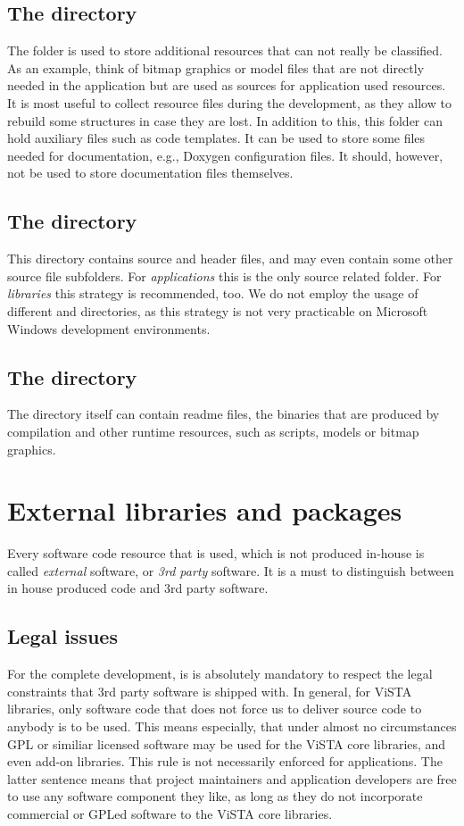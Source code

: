 \subsection{The  directory}
The  folder is used to store additional resources that can not really be classified.
As an example, think of bitmap graphics or model files that are not directly needed in the application but are used as sources for application used resources.
It is most useful to collect resource files during the development, as they allow to rebuild some structures in case they are lost.
In addition to this, this folder can hold auxiliary files such as code templates.
It can be used to store some files needed for documentation, e.g., Doxygen configuration files.
It should, however, not be used to store documentation files themselves.


\subsection{The  directory}
This directory contains source and header files, and may even contain some other source file subfolders.
For \textit{applications} this is the only source related folder.
For \textit{libraries} this strategy is recommended, too.
We do not employ the usage of different  and  directories, as this strategy is not very practicable on Microsoft Windows development environments.

\subsection{The  directory}
The directory itself can contain readme files, the binaries that are produced by compilation and other runtime resources, such as scripts, models or bitmap graphics.

\section{External libraries and packages}
Every software code resource that is used, which is not produced in-house is called \emph{external} software, or \emph{3rd party} software.
It is a must to distinguish between in house produced code and 3rd party software.

\subsection{Legal issues}
For the complete development, is is absolutely mandatory to respect the legal constraints that 3rd party software is shipped with.
In general, for ViSTA libraries, only software code that does not force us to deliver source code to anybody is to be used.
This means especially, that under almost no circumstances GPL or similiar licensed software may be used for the ViSTA core libraries, and even add-on libraries.
This rule is not necessarily enforced for applications.
The latter sentence means that project maintainers and application developers are free to use any software component they like, as long as they do not incorporate commercial or GPLed software to the ViSTA core libraries.

